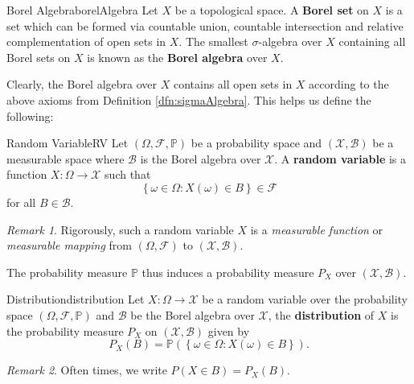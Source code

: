 \documentclass[math, code]{amznotes}
\theoremstyle{remark}
\newtheorem*{remark}{Remark}
\begin{document}
\begin{dfnbox}{Borel Algebra}{borelAlgebra}
    Let $X$ be a topological space. A {\color{red} \textbf{Borel set}} on $X$ is a set which can be formed via countable union, countable intersection and relative complementation of open sets in $X$. The smallest $\sigma$-algebra over $X$ containing all Borel sets on $X$ is known as the {\color{red} \textbf{Borel algebra}} over $X$.
\end{dfnbox}
Clearly, the Borel algebra over $X$ contains all open sets in $X$ according to the above axioms from Definition \ref{dfn:sigmaAlgebra}. This helps us define the following:
\begin{dfnbox}{Random Variable}{RV}
    Let $\left(\Omega, \mathcal{F}, \mathbb{P}\right)$ be a probability space and $\left(\mathcal{X}, \mathcal{B}\right)$ be a measurable space where $\mathcal{B}$ is the Borel algebra over $\mathcal{X}$. A {\color{red} \textbf{random variable}} is a function $X \colon \Omega \to \mathcal{X}$ such that 
    \begin{equation*}
        \left\{\omega \in \Omega \colon X\left(\omega\right) \in B\right\} \in \mathcal{F} 
    \end{equation*}
    for all $B \in \mathcal{B}$.
\end{dfnbox}
\begin{notebox}
    \begin{remark}
        Rigorously, such a random variable $X$ is a \textit{measurable function} or \textit{measurable mapping} from $\left(\Omega, \mathcal{F}\right)$ to $\left(\mathcal{X}, \mathcal{B}\right)$.
    \end{remark}
\end{notebox}
The probability measure $\mathbb{P}$ thus induces a probability measure $P_X$ over $\left(\mathcal{X}, \mathcal{B}\right)$.
\begin{dfnbox}{Distribution}{distribution}
    Let $X \colon \Omega \to \mathcal{X}$ be a random variable over the probability space $\left(\Omega, \mathcal{F}, \mathbb{P}\right)$ and $\mathcal{B}$ be the Borel algebra over $\mathcal{X}$, the {\color{red} \textbf{distribution}} of $X$ is the probability measure $P_X$ on $\left(\mathcal{X}, \mathcal{B}\right)$ given by 
    \begin{equation*}
        P_X\left(B\right) = \mathbb{P}\left(\left\{\omega \in \Omega \colon X\left(\omega\right) \in B\right\}\right).
    \end{equation*}
\end{dfnbox}
\begin{notebox}
    \begin{remark}
        Often times, we write $P\left(X \in B\right) = P_X\left(B\right)$.
    \end{remark}
\end{notebox}
\end{document}
